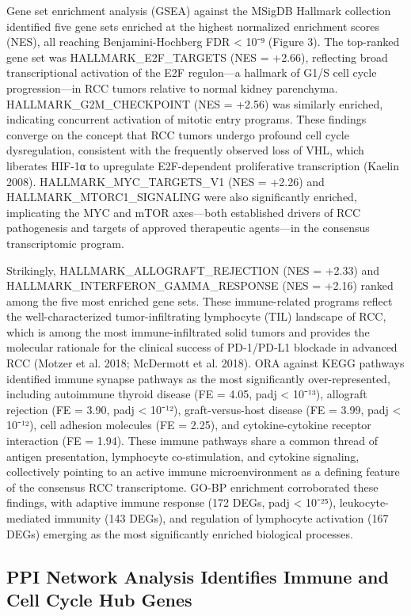 \documentclass[
  12pt,
]{article}
\begin{document}
Gene set enrichment analysis (GSEA) against the MSigDB Hallmark
collection identified five gene sets enriched at the highest normalized
enrichment scores (NES), all reaching Benjamini-Hochberg FDR \textless{}
10⁻⁹ (Figure 3). The top-ranked gene set was HALLMARK\_E2F\_TARGETS (NES
= +2.66), reflecting broad transcriptional activation of the E2F
regulon---a hallmark of G1/S cell cycle progression---in RCC tumors
relative to normal kidney parenchyma. HALLMARK\_G2M\_CHECKPOINT (NES =
+2.56) was similarly enriched, indicating concurrent activation of
mitotic entry programs. These findings converge on the concept that RCC
tumors undergo profound cell cycle dysregulation, consistent with the
frequently observed loss of VHL, which liberates HIF-1α to upregulate
E2F-dependent proliferative transcription (Kaelin 2008).
HALLMARK\_MYC\_TARGETS\_V1 (NES = +2.26) and HALLMARK\_MTORC1\_SIGNALING
were also significantly enriched, implicating the MYC and mTOR
axes---both established drivers of RCC pathogenesis and targets of
approved therapeutic agents---in the consensus transcriptomic program.

Strikingly, HALLMARK\_ALLOGRAFT\_REJECTION (NES = +2.33) and
HALLMARK\_INTERFERON\_GAMMA\_RESPONSE (NES = +2.16) ranked among the
five most enriched gene sets. These immune-related programs reflect the
well-characterized tumor-infiltrating lymphocyte (TIL) landscape of RCC,
which is among the most immune-infiltrated solid tumors and provides the
molecular rationale for the clinical success of PD-1/PD-L1 blockade in
advanced RCC (Motzer et al. 2018; McDermott et al. 2018). ORA against
KEGG pathways identified immune synapse pathways as the most
significantly over-represented, including autoimmune thyroid disease (FE
= 4.05, padj \textless{} 10⁻¹³), allograft rejection (FE = 3.90, padj
\textless{} 10⁻¹²), graft-versus-host disease (FE = 3.99, padj
\textless{} 10⁻¹²), cell adhesion molecules (FE = 2.25), and
cytokine-cytokine receptor interaction (FE = 1.94). These immune
pathways share a common thread of antigen presentation, lymphocyte
co-stimulation, and cytokine signaling, collectively pointing to an
active immune microenvironment as a defining feature of the consensus
RCC transcriptome. GO-BP enrichment corroborated these findings, with
adaptive immune response (172 DEGs, padj \textless{} 10⁻²⁵),
leukocyte-mediated immunity (143 DEGs), and regulation of lymphocyte
activation (167 DEGs) emerging as the most significantly enriched
biological processes.

\subsection{PPI Network Analysis Identifies Immune and Cell Cycle Hub
Genes}\label{ppi-network-analysis-identifies-immune-and-cell-cycle-hub-genes}
\end{document}
